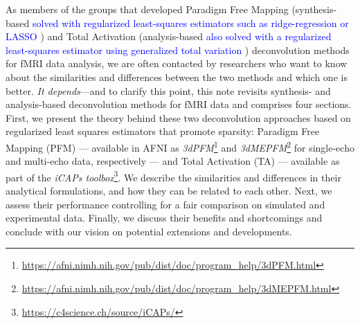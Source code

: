 As members of the groups that developed Paradigm Free Mapping (synthesis-based
\textcolor{blue}{solved with regularized least-squares estimators such as
ridge-regression \citealt{Gaudes2010Detectioncharacterizationsingle} or LASSO
\citealt{Gaudes2013Paradigmfreemapping}}) and Total Activation (analysis-based
\textcolor{blue}{also solved with a regularized least-squares estimator using
generalized total variation
\citealt{Karahanoglu2011SignalProcessingApproach,Karahanoglu2013TotalactivationfMRI}
}) deconvolution methods for fMRI data analysis, we are often contacted by
researchers who want to know about the similarities and differences between the
two methods and which one is better. \emph{It depends}---and to clarify this
point, this note revisits synthesis- and analysis-based deconvolution methods
for fMRI data and comprises four sections. First, we present the theory behind
these two deconvolution approaches based on regularized least squares estimators
that promote sparsity: Paradigm Free Mapping (PFM)
\citep{Gaudes2013Paradigmfreemapping} --- available in AFNI as
\textit{3dPFM}\footnote{\url{https://afni.nimh.nih.gov/pub/dist/doc/program_help/3dPFM.html}}
and
\textit{3dMEPFM}\footnote{\url{https://afni.nimh.nih.gov/pub/dist/doc/program_help/3dMEPFM.html}}
for single-echo and multi-echo data, respectively --- and Total Activation (TA)
\citep{Karahanoglu2013TotalactivationfMRI} --- available as part of the
\textit{iCAPs toolbox}\footnote{\url{https://c4science.ch/source/iCAPs/}}. We
describe the similarities and differences in their analytical formulations, and
how they can be related to each other. Next, we assess their performance
controlling for a fair comparison on simulated and experimental data. Finally,
we discuss their benefits and shortcomings and conclude with our vision on
potential extensions and developments.